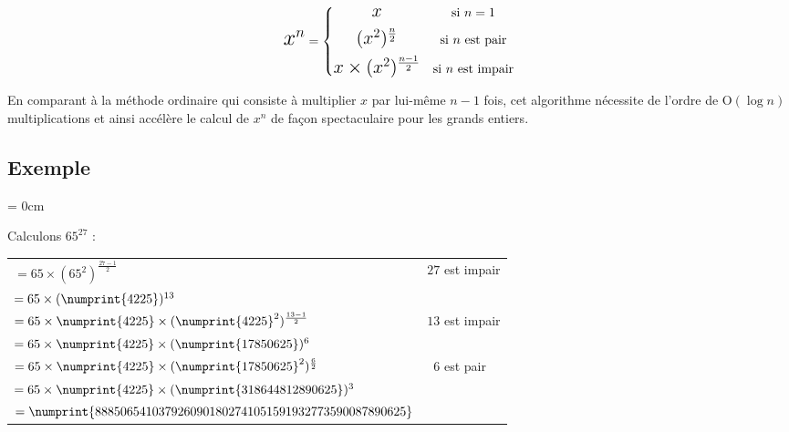 \documentclass[a4paper]{article}
\begin{document}
\vspace{-2mm}

    $${\mbox{{\LARGE $x^n$}}} = \left\{{   
    \begin{matrix}
    \vspace{2mm}
    {\mbox{{\Large $x$}}} & {\mbox{si $n = 1$}}\\
    \vspace{2mm}
    {\mbox{{\Large $(x^2)^{\frac{n}{2}}$}}} & {\mbox{si $n$ est pair}}\\
    {\mbox{{\Large $x \times (x^2)^{\frac{n-1}{2}}$}}} & {\mbox{si $n$ est impair}}\\
    \end{matrix}}\right.$$

\vspace{2mm}

En comparant à la méthode ordinaire qui consiste à multiplier $x$ par lui-même $n - 1$ fois, cet algorithme nécessite de l'ordre de $\mathrm{O}(\log n)$ multiplications et ainsi accélère le calcul de $x^n$ de façon spectaculaire pour les grands entiers.

\vfill

\subsection*{Exemple}

{\parindent = 0cm

Calculons $65^{27}$ :
\vspace{0.2cm}

\begin{large}
\begin{tabular}{l|l}

$= 65 \times (65^2)^{\frac{27-1}{2}}$ & \small $27$ est impair \\
$= 65 \times (\numprint{4225})^{13}$ \\
$= 65 \times \numprint{4225} \times (\numprint{4225}^2)^{\frac{13-1}{2}}$ & \small $13$ est impair \\
$= 65 \times \numprint{4225} \times (\numprint{17850625})^{6}$ \\
$= 65 \times \numprint{4225} \times (\numprint{17850625}^2)^{\frac{6}{2}}$ & \small $\phantom{0}6$ est pair \\
$= 65 \times \numprint{4225} \times (\numprint{318644812890625})^{3}$ \\
$= \numprint{8885065410379260901802741051591932773590087890625}$ \\

\end{tabular}
\end{large}
}
\end{document}
